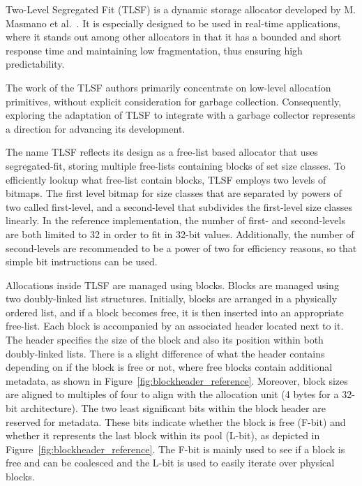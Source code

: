 
Two-Level Segregated Fit (TLSF) is a dynamic storage allocator developed by M. Masmano et al.~\cite{TLSF}. It is especially designed to be used in real-time applications, where it stands out among other allocators in that it has a bounded and short response time and maintaining low fragmentation, thus ensuring high predictability. 

The work of the TLSF authors primarily concentrate on low-level allocation primitives, without explicit consideration for garbage collection. Consequently, exploring the adaptation of TLSF to integrate with a garbage collector represents a direction for advancing its development.

The name TLSF reflects its design as a free-list based allocator that uses segregated-fit, storing multiple free-lists containing blocks of set size classes. To efficiently lookup what free-list contain blocks, TLSF employs two levels of bitmaps. The first level bitmap for size classes that are separated by powers of two called first-level, and a second-level that subdivides the first-level size classes linearly. In the reference implementation, the number of first- and second-levels are both limited to 32 in order to fit in 32-bit values. Additionally, the number of second-levels are recommended to be a power of two for efficiency reasons, so that simple bit instructions can be used.

Allocations inside TLSF are managed using blocks. Blocks are managed using two doubly-linked list structures. Initially, blocks are arranged in a physically ordered list, and if a block becomes free, it is then inserted into an appropriate free-list. Each block is accompanied by an associated header located next to it. The header specifies the size of the block and also its position within both doubly-linked lists. There is a slight difference of what the header contains depending on if the block is free or not, where free blocks contain additional metadata, as shown in Figure~\ref{fig:blockheader_reference}. Moreover, block sizes are aligned to multiples of four to align with the allocation unit (4 bytes for a 32-bit architecture). The two least significant bits within the block header are reserved for metadata. These bits indicate whether the block is free (F-bit) and whether it represents the last block within its pool (L-bit), as depicted in Figure~\ref{fig:blockheader_reference}. The F-bit is mainly used to see if a block is free and can be coalesced and the L-bit is used to easily iterate over physical blocks.

